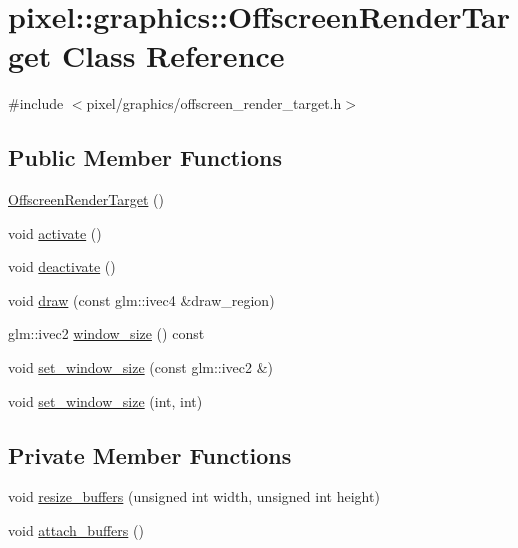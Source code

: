 \hypertarget{classpixel_1_1graphics_1_1_offscreen_render_target}{}\section{pixel\+:\+:graphics\+:\+:Offscreen\+Render\+Target Class Reference}
\label{classpixel_1_1graphics_1_1_offscreen_render_target}


{\ttfamily \#include $<$pixel/graphics/offscreen\+\_\+render\+\_\+target.\+h$>$}

\subsection*{Public Member Functions}
\begin{DoxyCompactItemize}
\item 
\hyperlink{classpixel_1_1graphics_1_1_offscreen_render_target_a09267c820dd5d349a0a455f8d38d442a}{Offscreen\+Render\+Target} ()
\item 
void \hyperlink{classpixel_1_1graphics_1_1_offscreen_render_target_a1ef8c7558df5d0defc1dd7083641d436}{activate} ()
\item 
void \hyperlink{classpixel_1_1graphics_1_1_offscreen_render_target_af4578733da935ecefd9d8e00032ff59c}{deactivate} ()
\item 
void \hyperlink{classpixel_1_1graphics_1_1_offscreen_render_target_a498298c152b939eda03742fde96507c9}{draw} (const glm\+::ivec4 \&draw\+\_\+region)
\item 
glm\+::ivec2 \hyperlink{classpixel_1_1graphics_1_1_offscreen_render_target_a146e78904b9f8ea9df00a141b17ac8b0}{window\+\_\+size} () const
\item 
void \hyperlink{classpixel_1_1graphics_1_1_offscreen_render_target_a47f5ea45b79659e2601e8f7ccc063c37}{set\+\_\+window\+\_\+size} (const glm\+::ivec2 \&)
\item 
void \hyperlink{classpixel_1_1graphics_1_1_offscreen_render_target_a1cfaa54b19e2f12fe839e95e947bb92c}{set\+\_\+window\+\_\+size} (int, int)
\end{DoxyCompactItemize}
\subsection*{Private Member Functions}
\begin{DoxyCompactItemize}
\item 
void \hyperlink{classpixel_1_1graphics_1_1_offscreen_render_target_a60bdb5799fc903d63922e63a873274af}{resize\+\_\+buffers} (unsigned int width, unsigned int height)
\item 
void \hyperlink{classpixel_1_1graphics_1_1_offscreen_render_target_acac4df8b179a089d8672ad5b84c1a27a}{attach\+\_\+buffers} ()
\end{DoxyCompactItemize}
